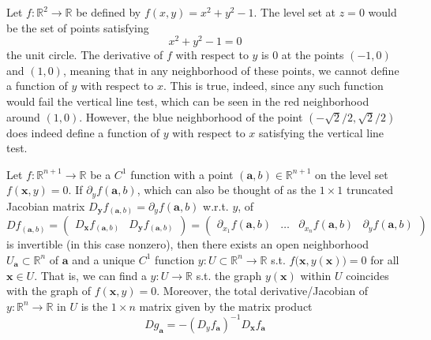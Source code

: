   \begin{example}[Circle]
    Let $f: \mathbb{R}^2 \longrightarrow \mathbb{R}$ be defined by $f(x, y) = x^2 + y^2 - 1$. The level set at $z = 0$ would be the set of points satisfying 
    \[x^2 + y^2 - 1 = 0\]
    the unit circle. The derivative of $f$ with respect to $y$ is $0$ at the points $(-1,0)$ and $(1,0)$, meaning that in any neighborhood of these points, we cannot define a function of $y$ with respect to $x$. This is true, indeed, since any such function would fail the vertical line test, which can be seen in the red neighborhood around $(1,0)$. However, the blue neighborhood of the point $(-\sqrt{2}/2, \sqrt{2}/2)$ does indeed define a function of $y$ with respect to $x$ satisfying the vertical line test. 
    \begin{center}
    \end{center}
  \end{example}

  \begin{theorem}
    Let $f: \mathbb{R}^{n+1} \longrightarrow \mathbb{R}$ be a $C^1$ function with a point $(\mathbf{a}, b) \in \mathbb{R}^{n+1}$ on the level set $f(\mathbf{x}, y) = 0$. If $\partial_y f (\mathbf{a}, b)$, which can also be thought of as the $1 \times 1$ truncated Jacobian matrix $D_\mathbf{y} f_{(\mathbf{a}, b)} = \partial_{y} f(\mathbf{a}, b)$ w.r.t. $y$, of 
    \[D f_{(\mathbf{a}, b)} = \begin{pmatrix} D_\mathbf{x} f_{(\mathbf{a}, b)} & D_\mathbf{y} f_{(\mathbf{a}, b)} \end{pmatrix} = \left(\begin{array}{ccc|c}
       \partial_{x_1} f(\mathbf{a}, b) &\ldots & \partial_{x_n} f(\mathbf{a}, b) & \partial_{y} f(\mathbf{a}, b)
       \end{array}\right)\]
    is invertible (in this case nonzero), then there exists an open neighborhood $U_\mathbf{a} \subset \mathbb{R}^n$ of $\mathbf{a}$ and a unique $C^1$ function $y: U \subset \mathbb{R}^n \longrightarrow \mathbb{R}$ s.t. $f\big(\mathbf{x}, y(\mathbf{x})\big) = 0$ for all $\mathbf{x} \in U$. That is, we can find a $y: U \longrightarrow \mathbb{R}$ s.t. the graph $y(\mathbf{x})$ within $U$ coincides with the graph of $f(\mathbf{x}, y) = 0$. Moreover, the total derivative/Jacobian of $y: \mathbb{R}^n \longrightarrow \mathbb{R}$ in $U$ is the $1 \times n$ matrix given by the matrix product
    \[D g_\mathbf{a} = - (D_y f_\mathbf{a})^{-1} D_\mathbf{x} f_\mathbf{a}\]
  \end{theorem}

